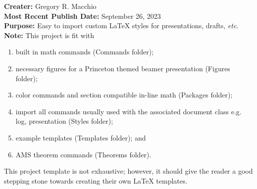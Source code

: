 \documentclass{article}
\begin{document}
    \noindent \textbf{Creater:} Gregory R. Macchio \\
    \textbf{Most Recent Publish Date:} September 26, 2023 \\
    \noindent \textbf{Purpose:} Easy to import custom LaTeX styles for presentations, drafts, \textit{etc}. \\
    \noindent \textbf{Note:}
    This project is fit with 
    \begin{enumerate}
        \item built in math commands (Commands folder);
        \item necessary figures for a Princeton themed beamer presentation (Figures folder);
        \item color commands and section compatible in-line math (Packages folder);
        \item import all commands usually used with the associated document class e.g. log, presentation (Styles folder);
        \item example templates (Templates folder); and
        \item AMS theorem commands (Theorems folder).
    \end{enumerate}
    \noindent This project template is not exhaustive; however, it should give the reader a good stepping stone towards creating their own LaTeX templates.
\end{document}
